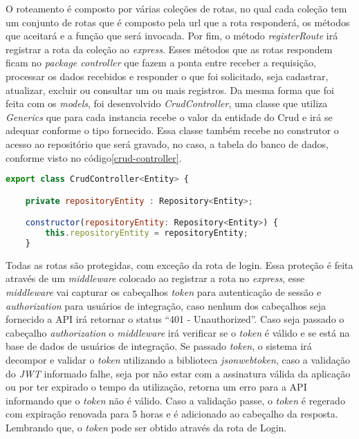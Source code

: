 O roteamento é composto por várias coleções de rotas, no qual cada coleção tem um conjunto de rotas que é composto pela url que a rota responderá, os métodos que aceitará e a função que será invocada.
Por fim, o método \textit{registerRoute} irá registrar a rota da coleção ao \textit{express}.
Esses métodos que as rotas respondem ficam no \textit{package controller} que fazem a ponta entre receber a requisição, processar os dados recebidos e responder o que foi solicitado, seja cadastrar, atualizar, excluir ou consultar um ou mais registros.
Da mesma forma que foi feita com os \textit{models}, foi desenvolvido \textit{CrudController}, uma classe que utiliza \textit{Generics} que para cada instancia recebe o valor da entidade do Crud e irá se adequar conforme o tipo fornecido. Essa classe também recebe no construtor o acesso ao repositório que será gravado, no caso, a tabela do banco de dados, conforme visto no código\ref{crud-controller}.

\begin{lstlisting}[language=JavaScript, caption={CrudController}, label={crud-controller}]
export class CrudController<Entity> {

	private repositoryEntity : Repository<Entity>;

	constructor(repositoryEntity: Repository<Entity>) {
		this.repositoryEntity = repositoryEntity;
	}
\end{lstlisting}

Todas as rotas são protegidas, com exceção da rota de login. Essa proteção é feita através de um \textit{middleware} colocado ao registrar a rota no \textit{express}, esse \textit{middleware} vai capturar os cabeçalhos \textit{token} para autenticação de sessão e \textit{authorization} para usuários de integração, caso nenhum dos cabeçalhos seja fornecido a API irá retornar o status ``401 - Unauthorized''. Caso seja passado o cabeçalho \textit{authorization} o \textit{middleware} irá verificar se o \textit{token} é válido e se está na base de dados de usuários de integração. Se passado \textit{token}, o sistema irá decompor e validar o \textit{token} utilizando a biblioteca \textit{jsonwebtoken}, caso a validação do \textit{JWT} informado falhe, seja por não estar com a assinatura válida da aplicação ou por ter expirado o tempo da utilização, retorna um erro para a API informando que o \textit{token} não é válido. Caso a validação passe, o \textit{token} é regerado com expiração renovada para 5 horas e é adicionado ao cabeçalho da resposta. Lembrando que, o \textit{token} pode ser obtido através da rota de Login.

